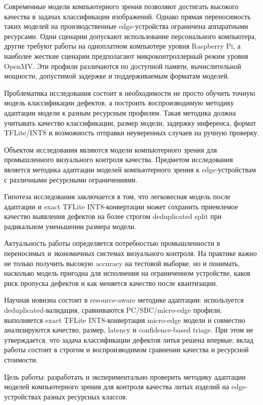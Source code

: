 \documentclass[12pt,a4paper]{article}
\begin{document}
Современные модели компьютерного зрения позволяют достигать высокого качества в задачах классификации изображений. Однако прямая переносимость таких моделей на производственные edge-устройства ограничена аппаратными ресурсами. Одни сценарии допускают использование персонального компьютера, другие требуют работы на одноплатном компьютере уровня Raspberry Pi, а наиболее жесткие сценарии предполагают микроконтроллерный режим уровня OpenMV. Эти профили различаются по доступной памяти, вычислительной мощности, допустимой задержке и поддерживаемым форматам моделей.

Проблематика исследования состоит в необходимости не просто обучить точную модель классификации дефектов, а построить воспроизводимую методику адаптации модели к разным ресурсным профилям. Такая методика должна учитывать качество классификации, размер модели, задержку инференса, формат TFLite/INT8 и возможность отправки неуверенных случаев на ручную проверку.

Объектом исследования являются модели компьютерного зрения для промышленного визуального контроля качества. Предметом исследования является методика адаптации моделей компьютерного зрения к edge-устройствам с различными ресурсными ограничениями.

Гипотеза исследования заключается в том, что легковесная модель после адаптации и exact TFLite INT8-конвертации может сохранить приемлемое качество выявления дефектов на более строгом deduplicated split при радикальном уменьшении размера модели.

Актуальность работы определяется потребностью промышленности в переносимых и экономичных системах визуального контроля. На практике важно не только получить высокую accuracy на тестовой выборке, но и понимать, насколько модель пригодна для исполнения на ограниченном устройстве, каков риск пропуска дефектов и как меняется качество после квантизации.

Научная новизна состоит в resource-aware методике адаптации: используется deduplicated-валидация, сравниваются PC/SBC/micro-edge профили, выполняется exact TFLite INT8-конвертация micro-edge модели и совместно анализируются качество, размер, latency и confidence-based triage. При этом не утверждается, что задача классификации дефектов литья решена впервые; вклад работы состоит в строгом и воспроизводимом сравнении качества и ресурсной стоимости.

Цель работы: разработать и экспериментально проверить методику адаптации моделей компьютерного зрения для контроля качества литых изделий на edge-устройствах разных ресурсных классов.
\end{document}
